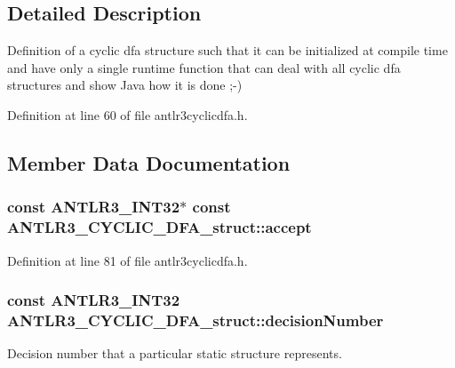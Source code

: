 \subsection{Detailed Description}
Definition of a cyclic dfa structure such that it can be initialized at compile time and have only a single runtime function that can deal with all cyclic dfa structures and show Java how it is done ;-\/) 

Definition at line 60 of file antlr3cyclicdfa.\-h.



\subsection{Member Data Documentation}
\hypertarget{struct_a_n_t_l_r3___c_y_c_l_i_c___d_f_a__struct_aafb1916b8b74b9822e740b3ee1447db2}{
\subsubsection[{accept}]{\setlength{\rightskip}{0pt plus 5cm}const {\bf A\-N\-T\-L\-R3\-\_\-\-I\-N\-T32}$\ast$ const A\-N\-T\-L\-R3\-\_\-\-C\-Y\-C\-L\-I\-C\-\_\-\-D\-F\-A\-\_\-struct\-::accept}}\label{struct_a_n_t_l_r3___c_y_c_l_i_c___d_f_a__struct_aafb1916b8b74b9822e740b3ee1447db2}


Definition at line 81 of file antlr3cyclicdfa.\-h.

\hypertarget{struct_a_n_t_l_r3___c_y_c_l_i_c___d_f_a__struct_a05be0e9321d8b6b9702cda3b34fe9834}{
\subsubsection[{decision\-Number}]{\setlength{\rightskip}{0pt plus 5cm}const {\bf A\-N\-T\-L\-R3\-\_\-\-I\-N\-T32} A\-N\-T\-L\-R3\-\_\-\-C\-Y\-C\-L\-I\-C\-\_\-\-D\-F\-A\-\_\-struct\-::decision\-Number}}\label{struct_a_n_t_l_r3___c_y_c_l_i_c___d_f_a__struct_a05be0e9321d8b6b9702cda3b34fe9834}
Decision number that a particular static structure represents. 

